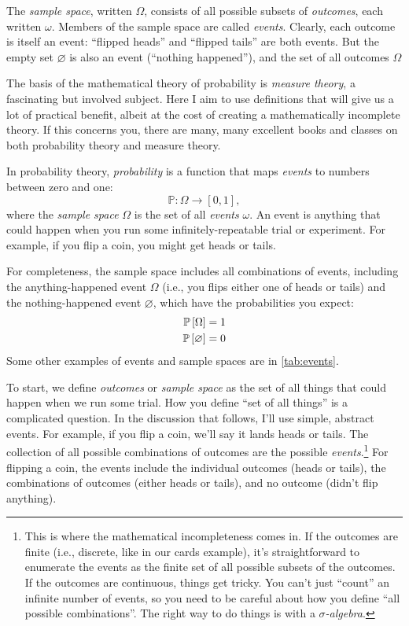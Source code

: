 The \emph{sample space}, written $\Omega$, consists of all possible subsets of
\emph{outcomes}, each written $\omega$. Members of the sample space are called
\emph{events}.  Clearly, each outcome is itself an event: ``flipped heads'' and
``flipped tails'' are both events. But the empty set $\varnothing$ is also an
event (``nothing happened''), and the set of all outcomes $\Omega$

The basis of the mathematical theory of probability is \emph{measure theory}, a
fascinating but involved subject. Here I aim to use definitions that will give
us a lot of practical benefit, albeit at the cost of creating a mathematically
incomplete theory. If this concerns you, there are many, many excellent books
and classes on both probability theory and measure theory.




In probability theory, \emph{probability} is a function that maps \emph{events}
to numbers between zero and one:
\begin{equation*}
\mathbb{P} : \Omega \to [0, 1],
\end{equation*}
where the \emph{sample space} $\Omega$ is the set of all \emph{events}
$\omega$. An event is anything that could happen when you run some
infinitely-repeatable trial or experiment. For example, if you flip a coin, you
might get heads or tails.

For completeness, the sample space includes all combinations of events,
including the anything-happened event $\Omega$ (i.e., you flips either one of
heads or tails) and the nothing-happened event $\varnothing$, which have the
probabilities you expect:
\begin{align*}
\mathbb{P}\left[{\Omega}\right] &= 1 \\
\mathbb{P}\left[{\varnothing}\right] &= 0
\end{align*}
Some other examples of events and sample spaces are in \ref{tab:events}.

To start, we define \emph{outcomes} or \emph{sample space} as the set of all
things that could happen when we run some trial. How you define ``set of all
things'' is a complicated question. In the discussion that follows, I'll use
simple, abstract events. For example, if you flip a coin, we'll say it lands
heads or tails. The collection of all possible combinations of outcomes are
the possible \emph{events}.\footnote{This is where the mathematical
incompleteness comes in. If the outcomes are finite (i.e., discrete, like in
our cards example), it's straightforward to enumerate the events as the finite
set of all possible subsets of the outcomes. If the outcomes are continuous,
things get tricky. You can't just ``count'' an infinite number of events, so
you need to be careful about how you define ``all possible combinations''. The
right way to do things is with a \emph{$\sigma$-algebra}.} For flipping a
coin, the events include the individual outcomes (heads or tails), the
combinations of outcomes (either heads or tails), and no outcome (didn't flip
anything).

